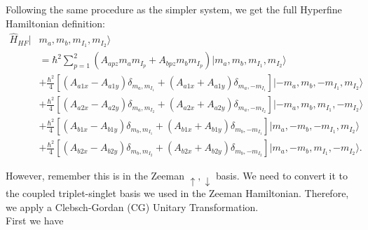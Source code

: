 \documentclass[svgnames]{article}
\begin{document}
Following the same procedure as the simpler system, we get the full Hyperfine
Hamiltonian definition: 
\begin{equation} \label{hyperfine}
    \begin{split}
    \hat{H}_{HF} |&m_a, m_b, m_{I_1}, m_{I_2}\rangle  \\
                       &= \hbar^2 \sum_{p=1}^{2} \left(A_{apz}m_am_{I_p} +
                       A_{bpz}m_bm_{I_p} \right) |m_a, m_b, m_{I_1},
                       m_{I_2}\rangle  \\ 
                       &+\frac{\hbar^2}{4}\left[\left( A_{a1x}-A_{a1y} \right)
                           \delta_{m_a, m_{I_1}} + \left( A_{a1x} + A_{a1y}
                           \right) \delta_{m_a, -m_{I_1}}  \right] |-m_a, m_b,
                           -m_{I_1}, m_{I_2}\rangle \\ 
                       &+\frac{\hbar^2}{4}\left[\left( A_{a2x}-A_{a2y} \right)
                           \delta_{m_a, m_{I_2}} + \left( A_{a2x} + A_{a2y}
                           \right) \delta_{m_a, -m_{I_2}}  \right] |-m_a, m_b,
                            m_{I_1}, -m_{I_2}\rangle \\ 
                       &+\frac{\hbar^2}{4}\left[\left( A_{b1x}-A_{b1y} \right)
                           \delta_{m_b, m_{I_1}} + \left( A_{b1x} + A_{b1y}
                           \right) \delta_{m_b, -m_{I_1}}  \right] |m_a, -m_b,
                           -m_{I_1}, m_{I_2}\rangle \\ 
                       &+\frac{\hbar^2}{4}\left[\left( A_{b2x}-A_{b2y} \right)
                           \delta_{m_b, m_{I_2}} + \left( A_{b2x} + A_{b2y}
                           \right) \delta_{m_b, -m_{I_2}}  \right] |m_a, -m_b,
                           m_{I_1}, -m_{I_2}\rangle.   
\end{split}
\end{equation}


However, remember this is in the Zeeman $\uparrow, \downarrow$ basis. We need to
convert it to the coupled triplet-singlet basis we used in the Zeeman
Hamiltonian. Therefore, we apply a Clebsch-Gordan (CG) Unitary Transformation. \\ 

First we have 
\end{document}
